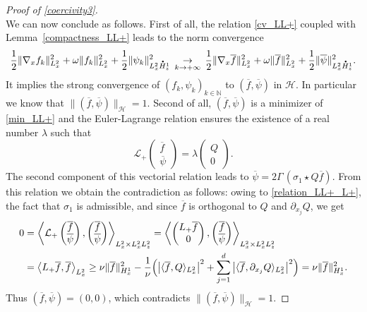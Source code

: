 \documentclass[10pt]{amsart}
\let\bar\oldbar
\theoremstyle{definition}
\newcommand*{\overbigdot}[1]{%
\accentset{\mbox{\large\bfseries .}}{#1}}
\let\bar\overline
\newenvironment{ProofOf}[1]{\begin{proof}[Proof of #1]}{\end{proof}}
\begin{document}
\begin{ProofOf}{\eqref{coercivity3}}
\begin{equation}
\end{equation}
We can now conclude as follows. First of all, the relation \eqref{cv_LL+} coupled with Lemma~\ref{compactness_LL+} leads to the norm convergence
\[
\frac{1}{2}\|\nabla_{x}f_{k}\|_{L_{x}^{2}}^{2}+\omega\|f_{k}\|_{L_{x}^{2}}^{2}+\frac{1}{2}\|\psi_{k}\|_{L_{x}^{2}\overbigdot{H}_{z}^{1}}^{2}\,\underset{k\to +\infty}{\to}\,\frac{1}{2}\|\nabla_{x}\bar{f}\|_{L_{x}^{2}}^{2}+\omega\|\bar{f}\|_{L_{x}^{2}}^{2}+\frac{1}{2}\|\bar{\psi}\|_{L_{x}^{2}\overbigdot{H}_{z}^{1}}^{2}.
\]
It implies the strong convergence of $(f_{k},\psi_{k})_{k\in\mathbb N}$ to $(\bar{f},\bar{\psi})$ in $\mathscr{H}$. In particular we know that $\|(\bar{f},\bar{\psi})\|_{\mathscr{H}}=1$. Second of all, $(\bar{f},\bar{\psi})$ is a minimizer of \eqref{min_LL+} and the Euler-Lagrange relation ensures the existence of a real number $\lambda$ such that
\[
\mathcal{L}_{+}\begin{pmatrix} \bar{f}\\\bar{\psi} \end{pmatrix}=\lambda\begin{pmatrix} Q\\0 \end{pmatrix}.
\]
The second component of this vectorial relation leads to $\bar{\psi}=2\Gamma\,(\sigma_{1}\star Q\bar{f})$. From this relation we obtain the contradiction as follows: owing to \eqref{relation_LL+_L+}, the fact that $\sigma_1$ is admissible, and since $\bar{f}$ is orthogonal to $Q$ and $\partial_{x_{j}}Q$, we get
\begin{align*}
0&=\left\langle\mathcal{L}_{+}\begin{pmatrix} \bar{f}\\\bar{\psi} \end{pmatrix},\begin{pmatrix} \bar{f}\\\bar{\psi} \end{pmatrix}\right\rangle_{L_{x}^{2}\times L_{x}^{2}L_{z}^{2}}=\left\langle\begin{pmatrix} L_{+}\bar{f}\\0 \end{pmatrix},\begin{pmatrix} \bar{f}\\\bar{\psi} \end{pmatrix}\right\rangle_{L_{x}^{2}\times L_{x}^{2}L_{z}^{2}}\\
&=\left\langle L_{+}\bar{f},\bar{f}\right\rangle_{L_{x}^{2}}\geq\nu\|\bar{f}\|_{H_{x}^{1}}^{2}-\frac{1}{\nu}\Bigl(\left|\langle \bar{f},Q\rangle_{L_{x}^{2}}\right|^{2}+\sum\limits_{j=1}^{d}\left|\langle \bar{f},\partial_{x_{j}}Q\rangle_{L_{x}^{2}}\right|^{2}\Bigr)=\nu\|\bar{f}\|_{H_{x}^{1}}^{2}.
\end{align*}
Thus $(\bar{f},\bar{\psi})=(0,0)$, which contradicts $\|(\bar{f},\bar{\psi})\|_{\mathscr{H}}=1$.
\end{ProofOf}
\end{document}
